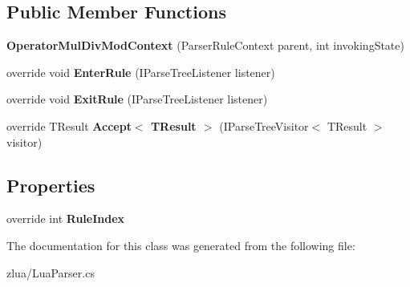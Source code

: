 \subsection*{Public Member Functions}
\begin{DoxyCompactItemize}
\item 
\mbox{\label{classzlua_1_1_lua_parser_1_1_operator_mul_div_mod_context_a793371a80bace734ff35372e24c45367}} 
{\bfseries Operator\+Mul\+Div\+Mod\+Context} (Parser\+Rule\+Context parent, int invoking\+State)
\item 
\mbox{\label{classzlua_1_1_lua_parser_1_1_operator_mul_div_mod_context_a46896f608cb77cb56d2b4bdbb6d8556b}} 
override void {\bfseries Enter\+Rule} (I\+Parse\+Tree\+Listener listener)
\item 
\mbox{\label{classzlua_1_1_lua_parser_1_1_operator_mul_div_mod_context_a7840d243e5585def0b3ae7285a4c4e96}} 
override void {\bfseries Exit\+Rule} (I\+Parse\+Tree\+Listener listener)
\item 
\mbox{\label{classzlua_1_1_lua_parser_1_1_operator_mul_div_mod_context_aacdc544cb7918e7fc919e68383d5eba7}} 
override T\+Result {\bfseries Accept$<$ T\+Result $>$} (I\+Parse\+Tree\+Visitor$<$ T\+Result $>$ visitor)
\end{DoxyCompactItemize}
\subsection*{Properties}
\begin{DoxyCompactItemize}
\item 
\mbox{\label{classzlua_1_1_lua_parser_1_1_operator_mul_div_mod_context_a5995ab67126f0269bd8079ed13d70dfb}} 
override int {\bfseries Rule\+Index}
\end{DoxyCompactItemize}


The documentation for this class was generated from the following file\+:\begin{DoxyCompactItemize}
\item 
zlua/Lua\+Parser.\+cs\end{DoxyCompactItemize}
